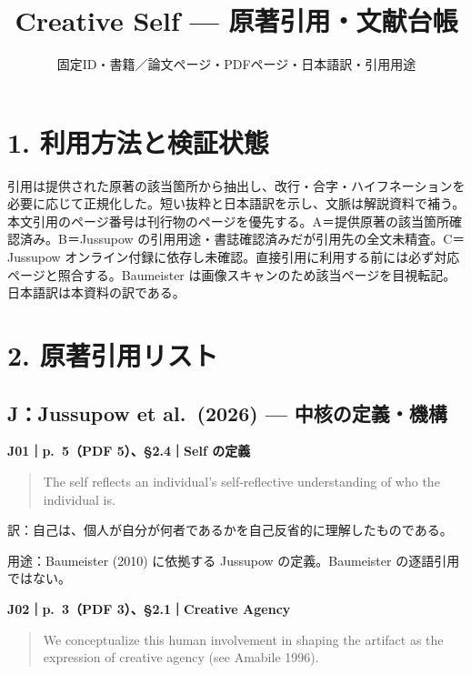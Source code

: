 \documentclass[
  11pt,
  a4paper,
]{article}
\title{Creative Self --- 原著引用・文献台帳}
\subtitle{固定ID・書籍／論文ページ・PDFページ・日本語訳・引用用途}
\author{}
\date{}
\begin{document}
\maketitle

\section{1.
利用方法と検証状態}\label{ux5229ux7528ux65b9ux6cd5ux3068ux691cux8a3cux72b6ux614b}

引用は提供された原著の該当箇所から抽出し、改行・合字・ハイフネーションを必要に応じて正規化した。短い抜粋と日本語訳を示し、文脈は解説資料で補う。本文引用のページ番号は刊行物のページを優先する。A＝提供原著の該当箇所確認済み。B＝Jussupow
の引用用途・書誌確認済みだが引用先の全文未精査。C＝Jussupow
オンライン付録に依存し未確認。直接引用に利用する前には必ず対応ページと照合する。Baumeister
は画像スキャンのため該当ページを目視転記。日本語訳は本資料の訳である。

\section{2.
原著引用リスト}\label{ux539fux8457ux5f15ux7528ux30eaux30b9ux30c8}

\subsection{J：Jussupow et al.~(2026) ---
中核の定義・機構}\label{jjussupow-et-al.-2026-ux4e2dux6838ux306eux5b9aux7fa9ux6a5fux69cb}


\textbf{J01｜p.~5（PDF 5）、§2.4｜Self の定義}

\begin{quote}
The self reflects an individual's self-reflective understanding of who
the individual is.
\end{quote}

訳：自己は、個人が自分が何者であるかを自己反省的に理解したものである。

用途：Baumeister (2010) に依拠する Jussupow の定義。Baumeister
の逐語引用ではない。


\textbf{J02｜p.~3（PDF 3）、§2.1｜Creative Agency}

\begin{quote}
We conceptualize this human involvement in shaping the artifact as the
expression of creative agency (see Amabile 1996).
\end{quote}
\end{document}
